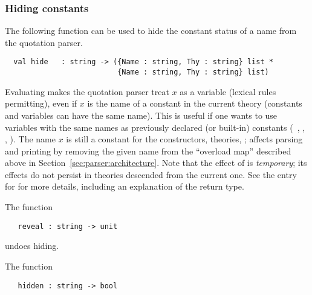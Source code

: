 \subsubsection{Hiding constants}
\label{hidden}

%
The following function can be used to hide the constant status of a
name from the quotation parser.

\begin{holboxed}
\begin{verbatim}
  val hide   : string -> ({Name : string, Thy : string} list *
                          {Name : string, Thy : string} list)
\end{verbatim}
\end{holboxed}

\noindent Evaluating 
makes the quotation parser treat $x$ as a variable (lexical
rules permitting), even if $x$ is the name of a constant in the current theory
(constants and variables can have the same name).
This is useful if one wants to use variables
%
%
with the same names as previously declared (or built-in) constants
(\eg\ , , , \etc).  The name $x$ is still a constant
for the constructors, theories, \etc;  affects parsing and
printing by removing the given name from the ``overload map'' described
above in Section~\ref{sec:parser:architecture}.  Note that the effect
of  is \emph{temporary}; its effects do not persist in
theories descended from the current one. See the \REFERENCE{} entry
for  for more details, including an explanation of the return
type.

The function

\begin{holboxed}
\begin{verbatim}
   reveal : string -> unit
\end{verbatim}
\end{holboxed}

\noindent undoes hiding.

The function

\begin{holboxed}
\begin{verbatim}
   hidden : string -> bool
\end{verbatim}
\end{holboxed}

